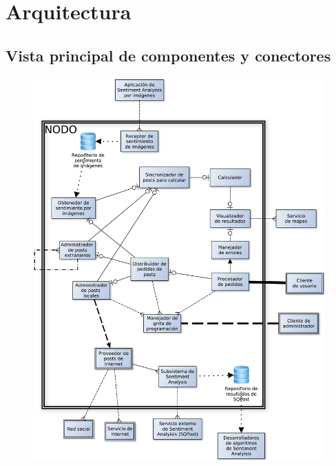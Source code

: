 
\section{Arquitectura}


\subsection{Vista principal de componentes y conectores}

\begin{figure}[H]
\centering
\includegraphics[width=\textwidth]{graph/main.pdf}
\end{figure}

